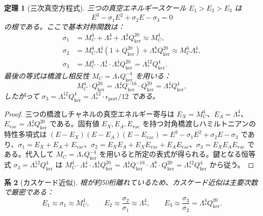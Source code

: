 \documentclass[12pt]{article}
\theoremstyle{plain}
\newtheorem{theorem}{定理}[section]
\newtheorem{corollary}[theorem]{系}
\theoremstyle{definition}
\numberwithin{equation}{section}
\newcommand{\kker}{\mathrm{ker}}
\begin{document}
\begin{theorem}[三次真空方程式]\label{thm:cubic}
三つの真空エネルギースケール $E_1>E_2>E_3$ は
\begin{equation}
\boxed{E^3-\sigma_1 E^2+\sigma_2 E-\sigma_3=0}
\end{equation}
の根である。ここで基本対称関数は：
\begin{align}
\sigma_1 &= M_C^4+\Lambda_*^4+\Lambda_*^4 Q_{\kker}^{20}\approx M_C^4,\\
\sigma_2 &= M_C^4\Lambda_*^4(1+Q_{\kker}^{20})+\Lambda_*^8 Q_{\kker}^{20}\approx M_C^4\Lambda_*^4,\\
\sigma_3 &= M_C^4\cdot\Lambda_*^4\cdot\Lambda_*^4 Q_{\kker}^{20}=\Lambda_*^{12}Q_{\kker}^4.
\end{align}
最後の等式は橋渡し相反性 $M_C=\Lambda_* Q_{\kker}^{-4}$ を用いる：
\begin{equation}
M_C^4\cdot Q_{\kker}^{20}=\Lambda_*^4 Q_{\kker}^{-16}\cdot Q_{\kker}^{20}=\Lambda_*^4 Q_{\kker}^4,
\end{equation}
したがって $\sigma_3=\Lambda_*^{12}Q_{\kker}^4=\Lambda_*^{12}\cdot\epsilon_{\mathrm{port}}/12$ である。
\end{theorem}

\begin{proof}
三つの橋渡しチャネルの真空エネルギー寄与は $E_X=M_C^4$、$E_A=\Lambda_*^4$、$E_{\mathrm{vac}}=\Lambda_*^4 Q_{\kker}^{20}$ である。固有値 $E_X,E_A,E_{\mathrm{vac}}$ を持つ対角橋渡しハミルトニアンの特性多項式は $(E-E_X)(E-E_A)(E-E_{\mathrm{vac}})=E^3-\sigma_1 E^2+\sigma_2 E-\sigma_3$ であり、$\sigma_1=E_X+E_A+E_{\mathrm{vac}}$、$\sigma_2=E_XE_A+E_XE_{\mathrm{vac}}+E_AE_{\mathrm{vac}}$、$\sigma_3=E_XE_AE_{\mathrm{vac}}$ である。代入して $M_C=\Lambda_* Q_{\kker}^{-4}$ を用いると所定の表式が得られる。鍵となる恒等式 $\sigma_3=\Lambda_*^{12}Q_{\kker}^4$ は $M_C^4\cdot\Lambda_*^4\cdot\Lambda_*^4 Q_{\kker}^{20}=\Lambda_*^4 Q_{\kker}^{-16}\cdot\Lambda_*^8\cdot Q_{\kker}^{20}=\Lambda_*^{12}Q_{\kker}^4$ から従う。
\end{proof}

\begin{corollary}[カスケード近似]\label{cor:cascade}
根が約50桁離れているため、カスケード近似は主要次数で厳密である：
\begin{equation}
E_1\approx\sigma_1\approx M_C^4,\qquad
E_2\approx\frac{\sigma_2}{\sigma_1}\approx\Lambda_*^4,\qquad
\boxed{E_3\approx\frac{\sigma_3}{\sigma_2}=\Lambda_*^4 Q_{\kker}^{20}.}
\end{equation}
\end{corollary}
\end{document}
